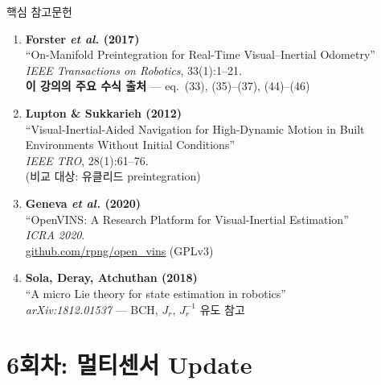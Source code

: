 \begin{frame}{핵심 참고문헌}

  \begin{enumerate}

    \item \textbf{Forster \textit{et al.} (2017)}\\
      ``On-Manifold Preintegration for Real-Time Visual–Inertial Odometry''\\
      \textit{IEEE Transactions on Robotics}, 33(1):1--21.\\
      \textbf{이 강의의 주요 수식 출처} — eq.~(33), (35)--(37), (44)--(46)

    \vspace{0.3em}
    \item \textbf{Lupton \& Sukkarieh (2012)}\\
      ``Visual-Inertial-Aided Navigation for High-Dynamic Motion in Built Environments Without Initial Conditions''\\
      \textit{IEEE TRO}, 28(1):61--76.\\
      (비교 대상: 유클리드 preintegration)

    \vspace{0.3em}
    \item \textbf{Geneva \textit{et al.} (2020)}\\
      ``OpenVINS: A Research Platform for Visual-Inertial Estimation''\\
      \textit{ICRA 2020}.\\
      \url{github.com/rpng/open_vins} (GPLv3)

    \vspace{0.3em}
    \item \textbf{Sola, Deray, Atchuthan (2018)}\\
      ``A micro Lie theory for state estimation in robotics''\\
      \textit{arXiv:1812.01537} — BCH, $J_r$, $J_r^{-1}$ 유도 참고

  \end{enumerate}
\end{frame}


\section{6회차: 멀티센서 Update}


